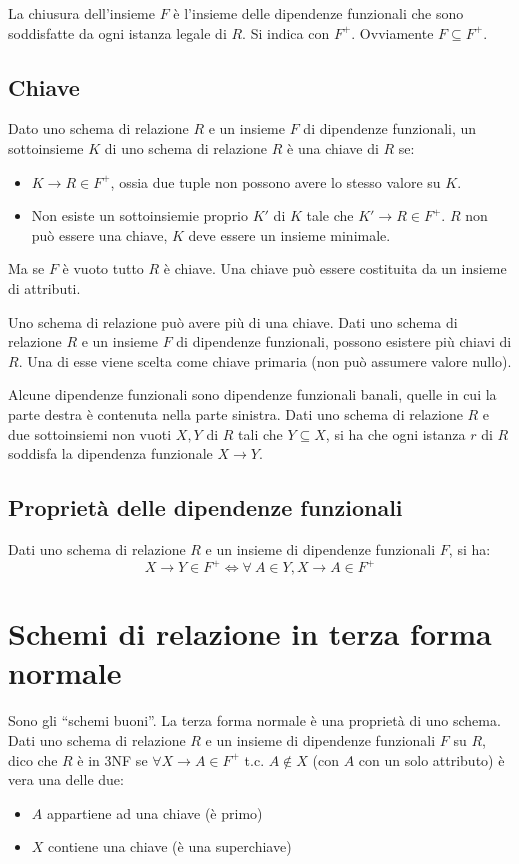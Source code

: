 La chiusura dell'insieme $F$ \`e l'insieme delle dipendenze funzionali che sono soddisfatte da ogni istanza legale di $R$. Si indica con $F^+$. Ovviamente $F \subseteq F^+$.

\subsection{Chiave}

Dato uno schema di relazione $R$ e un insieme $F$ di dipendenze funzionali, un sottoinsieme $K$ di uno schema di relazione $R$ \`e una chiave di $R$ se:
\begin{itemize}
    \item $K \to R \in F^+$, ossia due tuple non possono avere lo stesso valore su $K$. 
    \item Non esiste un sottoinsiemie proprio $K'$ di $K$ tale che $K' \to R \in F^+$. $R$ non pu\`o essere una chiave, $K$ deve essere un insieme minimale.
\end{itemize}
Ma se $F$ \`e vuoto tutto $R$ \`e chiave. Una chiave pu\`o essere costituita da un insieme di attributi.

Uno schema di relazione pu\`o avere pi\`u di una chiave. Dati uno schema di relazione $R$ e un insieme $F$ di dipendenze funzionali, possono esistere pi\`u chiavi di $R$. Una di esse viene scelta come chiave primaria (non pu\`o assumere valore nullo).

Alcune dipendenze funzionali sono dipendenze funzionali banali, quelle in cui la parte destra \`e contenuta nella parte sinistra. Dati uno schema di relazione $R$ e due sottoinsiemi non vuoti $X, Y$ di $R$ tali che $Y \subseteq X$, si ha che ogni istanza $r$ di $R$ soddisfa la dipendenza funzionale $X \to Y$.

\subsection{Propriet\`a delle dipendenze funzionali}

Dati uno schema di relazione $R$ e un insieme di dipendenze funzionali $F$, si ha:
\[
X \to Y \in F^+ \iff \forall \ A \in Y , X \to A \in F^+
\]

\section{Schemi di relazione in terza forma normale}

Sono gli ``schemi buoni''. La terza forma normale \`e una propriet\`a di uno schema. Dati uno schema di relazione $R$ e un insieme di dipendenze funzionali $F$ su $R$, dico che $R$ \`e in 3NF se $\forall X \to A \in F^+$ t.c. $ A \notin X$ (con $A$ con un solo attributo) \`e vera una delle due:
\begin{itemize}
    \item $A$ appartiene ad una chiave (\`e primo)
    \item $X$ contiene una chiave (\`e una superchiave)
\end{itemize}

